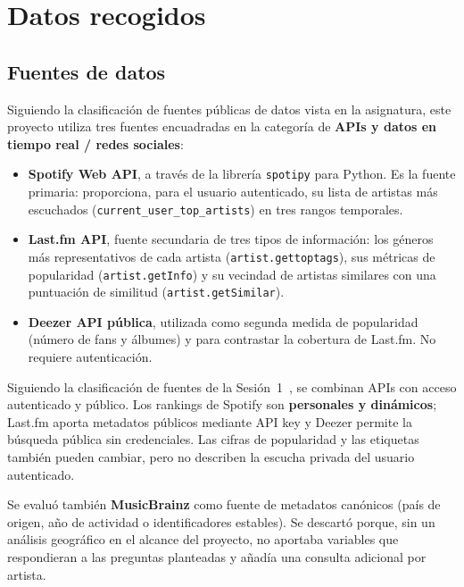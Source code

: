 
\chapter{Datos recogidos}
\label{chap:datos}

\section{Fuentes de datos}
\label{sec:fuentes}

Siguiendo la clasificación de fuentes públicas de datos vista en la asignatura, este proyecto utiliza tres fuentes encuadradas en la categoría de \textbf{APIs y datos en tiempo real / redes sociales}:

\begin{itemize}
    \item \textbf{Spotify Web API}, a través de la librería \texttt{spotipy} para Python. Es la fuente primaria: proporciona, para el usuario autenticado, su lista de artistas más escuchados (\texttt{current\_user\_top\_artists}) en tres rangos temporales.
    \item \textbf{Last.fm API}, fuente secundaria de tres tipos de información: los géneros más representativos de cada artista (\texttt{artist.gettoptags}), sus métricas de popularidad (\texttt{artist.getInfo}) y su vecindad de artistas similares con una puntuación de similitud (\texttt{artist.getSimilar}).
    \item \textbf{Deezer API pública}, utilizada como segunda medida de popularidad (número de fans y álbumes) y para contrastar la cobertura de Last.fm. No requiere autenticación.
\end{itemize}

Siguiendo la clasificación de fuentes de la Sesión~1~\cite{fuentes}, se combinan APIs con acceso autenticado y público. Los rankings de Spotify son \textbf{personales y dinámicos}; Last.fm aporta metadatos públicos mediante API key y Deezer permite la búsqueda pública sin credenciales. Las cifras de popularidad y las etiquetas también pueden cambiar, pero no describen la escucha privada del usuario autenticado.

Se evaluó también \textbf{MusicBrainz} como fuente de metadatos canónicos (país de origen, año de actividad o identificadores estables). Se descartó porque, sin un análisis geográfico en el alcance del proyecto, no aportaba variables que respondieran a las preguntas planteadas y añadía una consulta adicional por artista.

